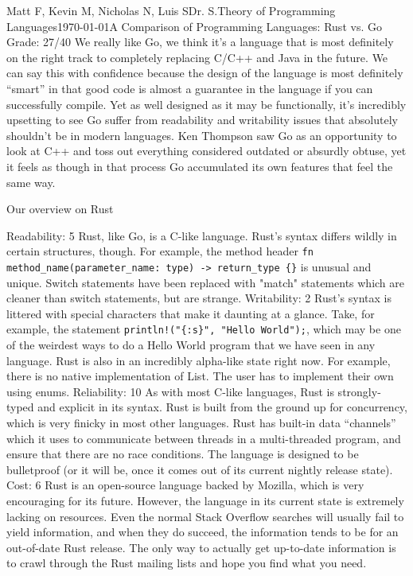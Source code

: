 \documentclass[12pt,letterpaper]{article}
\begin{document}
\begin{mla}{Matt F, Kevin M, Nicholas N, Luis S}{}{Dr. S.}{Theory of Programming Languages}{\today}{A Comparison of Programming Languages: Rust vs. Go}
Grade: 27/40
      	We really like Go, we think it's a language that is most definitely on the right track to completely replacing C/C++ and Java in the future. We can say this with confidence because the design of the language is most definitely ``smart'' in that good code is almost a guarantee in the language if you can successfully compile. Yet as well designed as it may be functionally, it's incredibly upsetting to see Go suffer from readability and writability issues that absolutely shouldn't be in modern languages. Ken Thompson saw Go as an opportunity to look at C++ and toss out everything considered outdated or absurdly obtuse, yet it feels as though in that process Go accumulated its own features that feel the same way.
      
      Our overview on Rust

Readability: 5
	Rust, like Go, is a C-like language. Rust's syntax differs wildly in certain structures, though. For example, the method header \texttt{fn method\_name(parameter\_name: type) -> return\_type \{<method body>\}} is unusual and unique. Switch statements have been replaced with "match" statements which are cleaner than switch statements, but are strange.
Writability: 2
	Rust's syntax is littered with special characters that make it daunting at a glance. Take, for example, the statement \texttt{println!("\{:s\}", "Hello World");}, which may be one of the weirdest ways to do a Hello World program that we have seen in any language. Rust is also in an incredibly alpha-like state right now. For example, there is no native implementation of List. The user has to implement their own using enums.
Reliability: 10
	 As with most C-like languages, Rust is strongly-typed and explicit in its syntax. Rust is built from the ground up for concurrency, which is very finicky in most other languages. Rust has built-in data ``channels'' which it uses to communicate between threads in a multi-threaded program, and ensure that there are no race conditions. The language is designed to be bulletproof (or it will be, once it comes out of its current nightly release state).
Cost: 6
	Rust is an open-source language backed by Mozilla, which is very encouraging for its future. However, the language in its current state is extremely lacking on resources. Even the normal Stack Overflow searches will usually fail to yield information, and when they do succeed, the information tends to be for an out-of-date Rust release. The only way to actually get up-to-date information is to crawl through the Rust mailing lists and hope you find what you need.

\end{mla}
\end{document}
